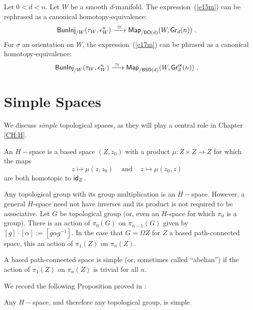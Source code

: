 Let $0<d<n$.
Let $W$ be a smooth $d$-manifold.
The expression~(\ref{e15m}) can be rephrased as a canonical homotopy-equivalence:
\begin{equation}
\label{l0m}
{\sf BunInj}_{/W}(\tau_{W}, \epsilon_{W}^{n}) 
\xrightarrow{~\simeq~}
 {\sf Map}_{/{\sf BO}(d)}(W, {\sf Gr}_{d}(n))
~.
\end{equation}
For $\sigma$ an orientation on $W$, the expression~(\ref{e17m}) can be phrased as a canonical homotopy-equivalence:
\begin{equation}
\label{l1m}
{\sf BunInj}_{/W}(\tau_{W}, \epsilon_{W}^{n}) 
\xrightarrow{~\simeq~}
{\sf Map}_{/{\sf BSO}(d)}(W, {\sf Gr}^{\sf or}_{d}(n))
~.
\end{equation}




\section{Simple Spaces} \label{sec.simple}
We discuss \textit{simple} topological spaces, as they will play a central role in Chapter \ref{CH:H}.


\begin{definition}
An $H-$space is a based space $(Z, z_{0})$ with a product $\mu: Z \times Z \longrightarrow Z$ for which the maps
\[
z \mapsto \mu(z, z_{0}) \hspace{10pt} \text{ and } \hspace{10pt} z \mapsto \mu(z_{0}, z)
\]
are both homotopic to $\operatorname{\sf id}_{Z}.$
\end{definition}

Any topological group with its group multiplication is an $H-$space. However, a general $H$-space need not have inverses and its product is not required to be associative.
Let $G$ be topological group (or, even an $H$-space for which $\pi_0$ is a group).
There is an action of $\pi_0(G)$ on $\pi_{n-1}(G)$ given by 
$[g] \cdot [\alpha] := [g \alpha g^{-1}]$.
In the case that $G = \Omega Z$ for $Z$ a based path-connected space, this an action of 
$\pi_1(Z)$ on $\pi_n(Z).$ 

\begin{definition}
A based path-connected space is simple (or, sometimes called ``abelian'') if the action of $\pi_1(Z)$ on $\pi_n(Z)$ is trivial for all $n.$
\end{definition}

We record the following Proposition proved in \cite{MoreMay}:
\begin{prop} \label{uniq.prop}
Any $H-$space, and therefore any topological group, is simple. 
\end{prop}

